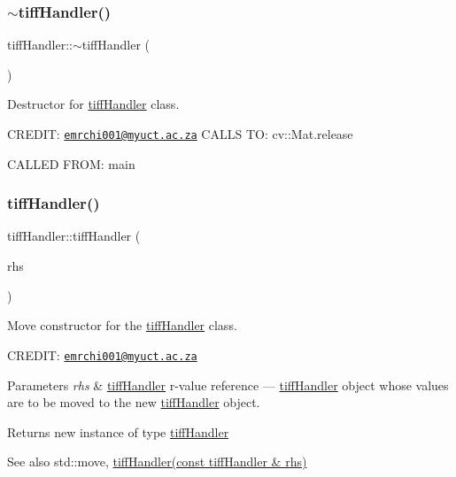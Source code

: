 \subsubsection{\texorpdfstring{$\sim$tiff\+Handler()}{~tiffHandler()}}
{\footnotesize\ttfamily tiff\+Handler\+::$\sim$tiff\+Handler (\begin{DoxyParamCaption}{ }\end{DoxyParamCaption})}



Destructor for \hyperlink{classtiffHandler}{tiff\+Handler} class. 

C\+R\+E\+D\+IT\+: \href{mailto:emrchi001@myuct.ac.za}{\tt emrchi001@myuct.\+ac.\+za} C\+A\+L\+LS TO\+: cv\+::\+Mat.\+release

C\+A\+L\+L\+ED F\+R\+OM\+: main \mbox{\label{classtiffHandler_a7bfe3d9b0553461580dcfb8467ec9d6d}} 
\subsubsection{\texorpdfstring{tiff\+Handler()}{tiffHandler()}\hspace{0.1cm}{\footnotesize\ttfamily [4/5]}}
{\footnotesize\ttfamily tiff\+Handler\+::tiff\+Handler (\begin{DoxyParamCaption}\item[{\hyperlink{classtiffHandler}{tiff\+Handler} \&\&}]{rhs }\end{DoxyParamCaption})}



Move constructor for the \hyperlink{classtiffHandler}{tiff\+Handler} class. 

C\+R\+E\+D\+IT\+: \href{mailto:emrchi001@myuct.ac.za}{\tt emrchi001@myuct.\+ac.\+za}


\begin{DoxyParams}{Parameters}
{\em rhs} & \hyperlink{classtiffHandler}{tiff\+Handler} r-\/value reference --- \hyperlink{classtiffHandler}{tiff\+Handler} object whose values are to be moved to the new \hyperlink{classtiffHandler}{tiff\+Handler} object.\\
\hline
\end{DoxyParams}
\begin{DoxyReturn}{Returns}
new instance of type \hyperlink{classtiffHandler}{tiff\+Handler}
\end{DoxyReturn}
\begin{DoxySeeAlso}{See also}
std\+::move, \hyperlink{classtiffHandler_af4ae13fb1aa69b262fd6e95cf5b4addb}{tiff\+Handler(const tiff\+Handler \& rhs)} 
\end{DoxySeeAlso}
\mbox{\label{classtiffHandler_af4ae13fb1aa69b262fd6e95cf5b4addb}} 
